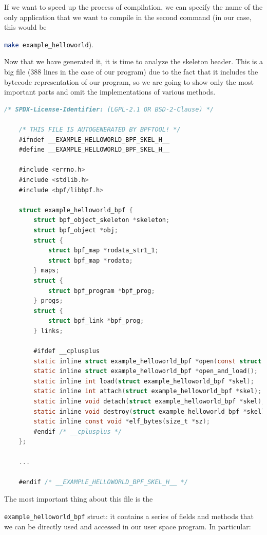 If we want to speed up the process of compilation, we can specify the name of the only application that we want to compile in the second command (in our case, this would be \raggedright\colorbox{backcolour}{\lstinline[style=commandline, language=bash]|make example_helloworld|}).

Now that we have generated it, it is time to analyze the skeleton header.
This is a big file (388 lines in the case of our program) due to the fact that it includes the bytecode representation of our program, so we are going to show only the most important parts and omit the implementations of various methods.

\begin{lstlisting}[style=cstyle, language=C, caption={Code of the skeleton file generated from the ``Hello world!''-like program in libbpf-bootstrap.}, title=example\_helloworld.skel.h]
	/* SPDX-License-Identifier: (LGPL-2.1 OR BSD-2-Clause) */
	
	/* THIS FILE IS AUTOGENERATED BY BPFTOOL! */
	#ifndef __EXAMPLE_HELLOWORLD_BPF_SKEL_H__
	#define __EXAMPLE_HELLOWORLD_BPF_SKEL_H__
	
	#include <errno.h>
	#include <stdlib.h>
	#include <bpf/libbpf.h>
	
	struct example_helloworld_bpf {
		struct bpf_object_skeleton *skeleton;
		struct bpf_object *obj;
		struct {
			struct bpf_map *rodata_str1_1;
			struct bpf_map *rodata;
		} maps;
		struct {
			struct bpf_program *bpf_prog;
		} progs;
		struct {
			struct bpf_link *bpf_prog;
		} links;
		
		#ifdef __cplusplus
		static inline struct example_helloworld_bpf *open(const struct bpf_object_open_opts *opts = nullptr);
		static inline struct example_helloworld_bpf *open_and_load();
		static inline int load(struct example_helloworld_bpf *skel);
		static inline int attach(struct example_helloworld_bpf *skel);
		static inline void detach(struct example_helloworld_bpf *skel);
		static inline void destroy(struct example_helloworld_bpf *skel);
		static inline const void *elf_bytes(size_t *sz);
		#endif /* __cplusplus */
	};
	
	...
	
	#endif /* __EXAMPLE_HELLOWORLD_BPF_SKEL_H__ */
\end{lstlisting}

The most important thing about this file is the \raggedright\colorbox{backcolour}{\lstinline[style=commandline, language=bash]|example_helloworld_bpf|} struct: it contains a series of fields and methods that we can be directly used and accessed in our user space program.
In particular:

